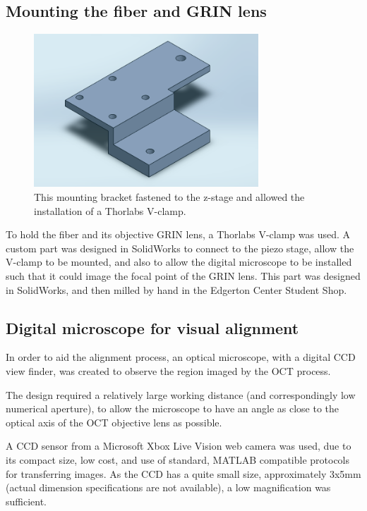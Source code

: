 \subsection{Mounting the fiber and GRIN lens}

\begin{figure}[h!]
\centering
\includegraphics[width=0.75\textwidth]{Images/Alignment/mounting_plate.png}
\caption{This mounting bracket fastened to the z-stage and allowed the installation of a Thorlabs V-clamp.}
\end{figure}

To hold the fiber and its objective GRIN lens, a Thorlabs V-clamp was used. A custom part was designed in SolidWorks to connect to the piezo stage, allow the V-clamp to be mounted, and also to allow the digital microscope to be installed such that it could image the focal point of the GRIN lens. This part was designed in SolidWorks, and then milled by hand in the Edgerton Center Student Shop.

\subsection{Digital microscope for visual alignment}


In order to aid the alignment process, an optical microscope, with a digital CCD view finder, was created to observe the region imaged by the OCT process.

The design required a relatively large working distance (and correspondingly low numerical aperture), to allow the microscope to have an angle as close to the optical axis of the OCT objective lens as possible.

A CCD sensor from a Microsoft Xbox Live Vision web camera was used, due to its compact size, low cost, and use of standard, MATLAB compatible protocols for transferring images. As the CCD has a quite small size, approximately 3x5mm (actual dimension specifications are not available), a low magnification was sufficient.

